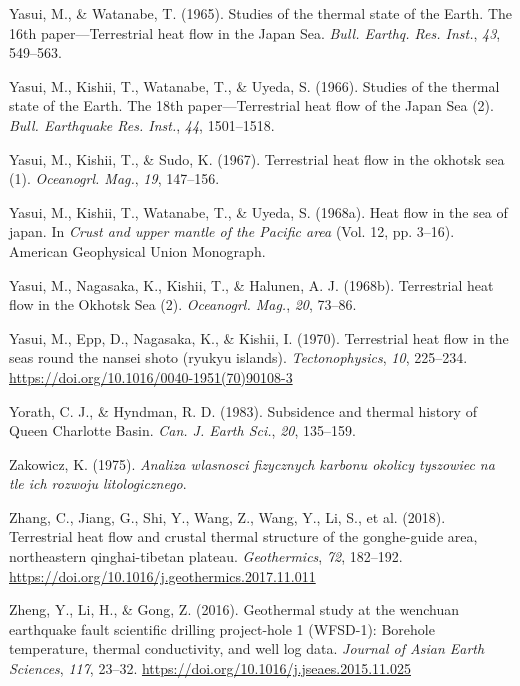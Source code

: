 \begin{CSLReferences}{1}{1}
\leavevmode{}%
Yasui, M., \& Watanabe, T. (1965). Studies of the thermal state of the {Earth}. {The 16th paper---Terrestrial heat flow in the Japan Sea}. \emph{Bull. Earthq. Res. Inst.}, \emph{43}, 549--563.

\leavevmode{}%
Yasui, M., Kishii, T., Watanabe, T., \& Uyeda, S. (1966). Studies of the thermal state of the {Earth}. {The 18th paper---Terrestrial heat flow of the Japan Sea (2)}. \emph{Bull. Earthquake Res. Inst.}, \emph{44}, 1501--1518.

\leavevmode{}%
Yasui, M., Kishii, T., \& Sudo, K. (1967). Terrestrial heat flow in the okhotsk sea (1). \emph{Oceanogrl. Mag.}, \emph{19}, 147--156.

\leavevmode{}%
Yasui, M., Kishii, T., Watanabe, T., \& Uyeda, S. (1968a). Heat flow in the sea of japan. In \emph{Crust and upper mantle of the {Pacific} area} (Vol. 12, pp. 3--16). American Geophysical Union Monograph.

\leavevmode{}%
Yasui, M., Nagasaka, K., Kishii, T., \& Halunen, A. J. (1968b). Terrestrial heat flow in the {Okhotsk Sea (2)}. \emph{Oceanogrl. Mag.}, \emph{20}, 73--86.

\leavevmode{}%
Yasui, M., Epp, D., Nagasaka, K., \& Kishii, I. (1970). Terrestrial heat flow in the seas round the nansei shoto (ryukyu islands). \emph{Tectonophysics}, \emph{10}, 225--234. \url{https://doi.org/10.1016/0040-1951(70)90108-3}

\leavevmode{}%
Yorath, C. J., \& Hyndman, R. D. (1983). Subsidence and thermal history of {Queen Charlotte Basin}. \emph{Can. J. Earth Sci.}, \emph{20}, 135--159.

\leavevmode{}%
Zakowicz, K. (1975). \emph{Analiza w{l}asnosci fizycznych karbonu okolicy tyszowiec na tle ich rozwoju litologicznego}.

\leavevmode{}%
Zhang, C., Jiang, G., Shi, Y., Wang, Z., Wang, Y., Li, S., et al. (2018). Terrestrial heat flow and crustal thermal structure of the gonghe-guide area, northeastern qinghai-tibetan plateau. \emph{Geothermics}, \emph{72}, 182--192. \url{https://doi.org/10.1016/j.geothermics.2017.11.011}

\leavevmode{}%
Zheng, Y., Li, H., \& Gong, Z. (2016). Geothermal study at the wenchuan earthquake fault scientific drilling project-hole 1 ({WFSD}-1): Borehole temperature, thermal conductivity, and well log data. \emph{Journal of Asian Earth Sciences}, \emph{117}, 23--32. \url{https://doi.org/10.1016/j.jseaes.2015.11.025}


\end{CSLReferences}
